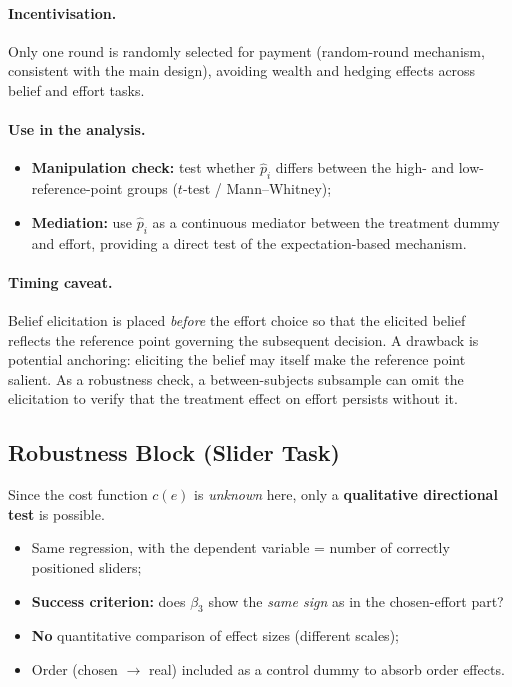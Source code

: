 \documentclass[
    11pt,
    a4paper,
    parskip=half,
    headings=normal
]{scrartcl}
\numberwithin{equation}{section}
\theoremstyle{definition}
\theoremstyle{remark}
\begin{document}
\paragraph{Incentivisation.}
Only one round is randomly selected for payment (random-round mechanism,
consistent with the main design), avoiding wealth and hedging effects
across belief and effort tasks.

\paragraph{Use in the analysis.}
\begin{itemize}
    \item \textbf{Manipulation check:} test whether $\hat{p}_i$ differs
    between the high- and low-reference-point groups
    ($t$-test / Mann--Whitney);
    \item \textbf{Mediation:} use $\hat{p}_i$ as a continuous mediator
    between the treatment dummy and effort, providing a direct test of the
    expectation-based mechanism.
\end{itemize}

\paragraph{Timing caveat.}
Belief elicitation is placed \emph{before} the effort choice so that the
elicited belief reflects the reference point governing the subsequent
decision. A drawback is potential anchoring: eliciting the belief may itself
make the reference point salient. As a robustness check, a between-subjects
subsample can omit the elicitation to verify that the treatment effect on
effort persists without it.

\subsection{Robustness Block (Slider Task)}
Since the cost function $c(e)$ is \emph{unknown} here, only a \textbf{qualitative directional test} is possible.
\begin{itemize}
    \item Same regression, with the dependent variable = number of correctly positioned sliders;
    \item \textbf{Success criterion:} does $\beta_3$ show the \emph{same sign} as in the chosen-effort part?
    \item \textbf{No} quantitative comparison of effect sizes (different scales);
    \item Order (chosen $\rightarrow$ real) included as a control dummy to absorb order effects.
\end{itemize}
\end{document}
